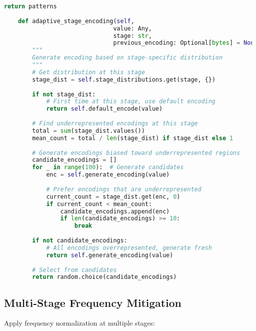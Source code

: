 \begin{lstlisting}[language=Python, caption={Tracking distribution through computation}]
        return patterns
    
    def adaptive_stage_encoding(self,
                               value: Any,
                               stage: str,
                               previous_encoding: Optional[bytes] = None) -> bytes:
        """
        Generate encoding based on stage-specific distribution
        """
        # Get distribution at this stage
        stage_dist = self.stage_distributions.get(stage, {})
        
        if not stage_dist:
            # First time at this stage, use default encoding
            return self.default_encode(value)
        
        # Find underrepresented encodings at this stage
        total = sum(stage_dist.values())
        mean_count = total / len(stage_dist) if stage_dist else 1
        
        # Generate encodings biased toward underrepresented regions
        candidate_encodings = []
        for _ in range(100):  # Generate candidates
            enc = self.generate_encoding(value)
            
            # Prefer encodings that are underrepresented
            current_count = stage_dist.get(enc, 0)
            if current_count < mean_count:
                candidate_encodings.append(enc)
                if len(candidate_encodings) >= 10:
                    break
        
        if not candidate_encodings:
            # All encodings overrepresented, generate fresh
            return self.generate_encoding(value)
        
        # Select from candidates
        return random.choice(candidate_encodings)
\end{lstlisting}

\subsection{Multi-Stage Frequency Mitigation}

Apply frequency normalization at multiple stages:

